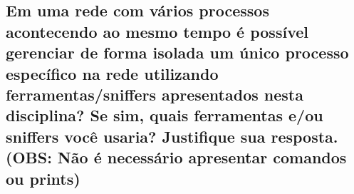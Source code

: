 \documentclass[12pt,a4paper]{report}
\begin{document}
\subsection{Em uma rede com vários processos acontecendo ao mesmo tempo é possível gerenciar de forma isolada um único processo específico na rede utilizando ferramentas/sniffers apresentados nesta disciplina? Se sim, quais ferramentas e/ou sniffers você usaria? Justifique sua resposta. (OBS: Não é necessário apresentar comandos ou prints)}
\end{document}
